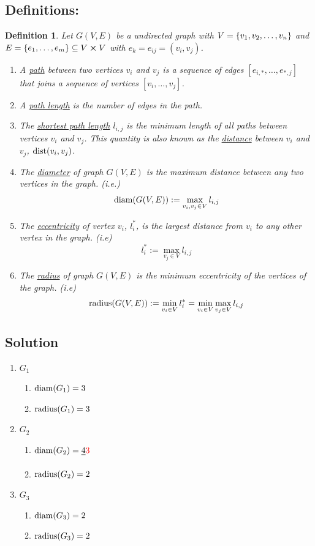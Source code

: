 \documentclass[]{article}
\numberwithin{equation}{section}
\newtheorem{definition}{Definition}
\newcommand{\diam}{\textnormal{diam}}
\newcommand{\radius}{\textnormal{radius}}
\begin{document}
\subsection{Definitions:}
\begin{definition}\label{def:path_diam_radius_etc}
	Let $G(V,E)$ be a undirected graph with $V = \qty{v_1,v_2,\dots,v_n}$ 
	and $E = \qty{e_1, \dots, e_m} \subseteq V \cross V$ 
	with $e_k = e_{ij} = (v_i, v_j)$.
	\begin{enumerate}
		\item A \emph{\underline{path}} between two vertices $v_i$ and $v_j$ is a sequence of edges $[e_{i, *}, \dots, e_{*, j}]$ that joins a sequence of vertices $[v_i, \dots, v_j]$.
		\item A \emph{\underline{path length}} is the number of edges in the path. 
		\item The \emph{\underline{shortest path length}} $l_{i,j}$ is the minimum length of all paths between vertices $v_i$ and $v_j$. 
		This quantity is also known as the \emph{\underline{distance}} between $v_i$ and $v_j$, $\text{dist}\qty(v_i,v_j)$.
		\item The \emph{\underline{diameter}} of graph $G(V,E)$ is the maximum distance between any two vertices in the graph. 
		(i.e.)\[
			\diam(G(V,E)) := \max_{v_i,v_j \in V} l_{i,j}
		\]
		\item The \emph{\underline{eccentricity}} of vertex $v_i$, $l_{i}^{*}$, is the largest distance from $v_i$ to any other vertex in the graph. 
		(i.e)\[
			l_{i}^{*} := \max_{v_j \in V} l_{i,j}
		\]
		\item The \emph{\underline{radius}} of graph $G(V,E)$ is the minimum eccentricity of the vertices of the graph.
		(i.e)\[
			\radius(G(V,E)) := \min_{v_i \in V} l_{i}^{*} = \min_{v_i \in V} \max_{v_j \in V} l_{i,j}
		\]
	\end{enumerate}
\end{definition}

\subsection{Solution}
\begin{enumerate}
	\item $G_1$
	\begin{enumerate}
		\item $\diam(G_1) = 3$
		\item $\radius(G_1) = 3$
	\end{enumerate}
	\item $G_2$
	\begin{enumerate}
		\item $\diam(G_2) = \sout{4}{\color{red} 3}$
		\item $\radius(G_2) = 2$
	\end{enumerate}
	\item $G_3$
	\begin{enumerate}
		\item $\diam(G_3) = 2$
		\item $\radius(G_3) = 2$
	\end{enumerate}
\end{enumerate}
\end{document}
